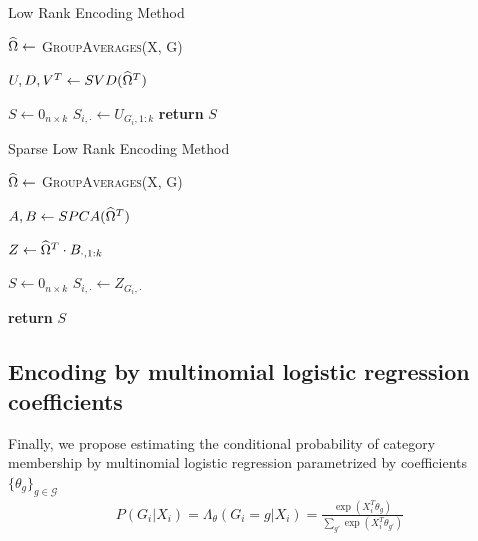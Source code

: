 \documentclass{article}
\theoremstyle{plain}
\theoremstyle{definition}
\theoremstyle{remark}
\begin{document}
\begin{algorithm}
\caption{Low Rank Encoding Method}\label{alg:lowrankmethod}
\begin{algorithmic}[1]

\State $\widehat{\Omega} \gets$ \textsc{GroupAverages}(X, G)

\State $U,D,V^T \gets SVD(\widehat{\Omega}^T)$

\State $S \gets 0_{n \times k}$
  \State $S_{i,\cdot} \gets U_{G_{i},1:k}$
\EndFor
\State \textbf{return} $S$
\EndProcedure
\end{algorithmic}
\end{algorithm}


\begin{algorithm}
\caption{Sparse Low Rank Encoding Method}\label{alg:sparselowrankmethod}
\begin{algorithmic}[1]

\State $\widehat{\Omega} \gets$ \textsc{GroupAverages}(X, G)

\State $A, B \gets SPCA(\widehat{\Omega}^T)$

\State $Z \gets \widehat{\Omega}^T \cdot B_{\cdot,1:k}$

\State $S \gets 0_{n \times k}$
\State $S_{i,\cdot} \gets Z_{G_i,\cdot}$
\EndFor

\State \textbf{return} $S$
\EndProcedure
\end{algorithmic}
\end{algorithm}



\subsection{Encoding by multinomial logistic regression coefficients}
\label{subsec:mnl}

Finally, we propose estimating the conditional probability of category membership by multinomial logistic regression parametrized by coefficients $\{\theta_{g} \}_{g \in \mathcal{G}}$
\begin{align}
P(G_{i}|X_{i}) = \Lambda_{\theta}(G_{i}=g | X_{i}) =  \frac{\exp(X_{i}^{T} \theta_{g})}{\sum_{g'}\exp(X_{i}^{T}\theta_{g'})}
\label{eq:mnl}
\end{align}
\end{document}

